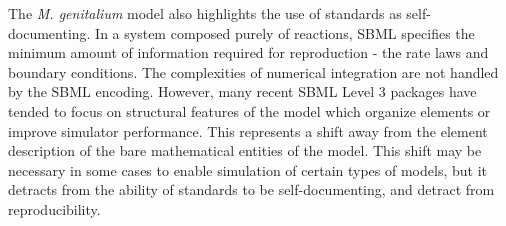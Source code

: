 \documentclass[journal,transmag,twoside]{IEEEtran}
\begin{document}
The \textit{M. genitalium} model also highlights the use of
standards as self-documenting. In a system composed purely of reactions,
SBML specifies the minimum amount of information required for reproduction - the rate laws and
boundary conditions. The complexities of numerical integration are not handled by the SBML encoding.
However, many recent SBML Level 3 packages have tended to focus on
structural features of the model which organize elements or
improve simulator performance.
This represents a shift away from the element description of the bare mathematical
entities of the model. This shift may be necessary in some cases to enable
simulation of certain types of models, but it detracts from the ability
of standards to be self-documenting, and detract from reproducibility.




%
%



%
%
\end{document}
